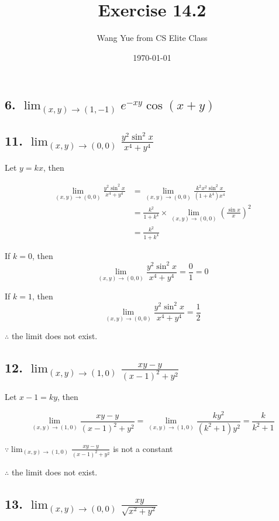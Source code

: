 \documentclass{article}
\begin{document}
    \title{Exercise 14.2}
    \author{Wang Yue from CS Elite Class}
    \date{\today}
    \maketitle

    \subsection*{6. $\lim_{(x, y) \to (1, -1)} e^{-xy}\cos (x + y)$}

    \subsection*{11. $\lim_{(x, y) \to (0, 0)} \frac{y^2 \sin^2 x}{x^4 + y^4}$}

    Let $y = kx$, then 
    
    $$\begin{aligned}
        \lim_{(x, y) \to (0, 0)} \frac{y^2\sin^2 x}{x^4 + y^4} &= \lim_{(x, y)\to(0, 0)} \frac{k^2x^2\sin^2 x}{(1+k^4)x^4} \\
        &= \frac{k^2}{1 + k^4} \times \lim_{(x, y) \to (0, 0)} (\frac{\sin x}{x})^2 \\
        &= \frac{k^2}{1 + k^4}
    \end{aligned}$$

    If $k = 0$, then $$\lim_{(x, y) \to (0, 0)} \frac{y^2\sin^2 x}{x^4 + y^4} = \frac 0 1 = 0$$

    If $k = 1$, then $$\lim_{(x, y) \to (0, 0)} \frac{y^2\sin^2 x}{x^4 + y^4} = \frac 1 2$$

    $\therefore$ the limit does not exist.

    \subsection*{12. $\lim_{(x, y) \to (1, 0)} \frac{xy-y}{(x-1)^2 + y^2}$}

    Let $x - 1= ky$, then 
    
    $$\lim_{(x, y) \to (1, 0)} \frac{xy-y}{(x-1)^2 + y^2} = \lim_{(x, y) \to (1, 0)} \frac{ky^2}{(k^2 + 1)y^2} = \frac{k}{k^2+1}$$

    $\because \lim_{(x, y) \to (1, 0)} \frac{xy-y}{(x-1)^2 + y^2}$ is not a constant

    $\therefore $ the limit does not exist.

    \subsection*{13. $\lim_{(x, y) \to (0, 0)} \frac{xy}{\sqrt{x^2 + y^2}}$}
\end{document}
